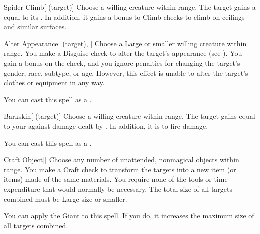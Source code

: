 \lowercase{\hypertarget{spell:Spider Climb}{}}\label{spell:Spider Climb}
\begin{attuneability}[\nth{1}]{\hypertarget{spell:Spider Climb}{Spider Climb}}[ (target)]
Choose a willing creature within \rngclose range.
The target gains a  equal to its .
In addition, it gains a  bonus to Climb checks to climb on ceilings and similar surfaces.
\end{attuneability}
\vspace{0.25em}



\lowercase{\hypertarget{spell:Alter Appearance}{}}\label{spell:Alter Appearance}
\begin{attuneability}[\nth{2}]{\hypertarget{spell:Alter Appearance}{Alter Appearance}}[ (target), ]
Choose a Large or smaller willing creature within \rngclose range.
You make a Disguise check to alter the target's appearance (see ).
You gain a  bonus on the check, and you ignore penalties for changing the target's gender, race, subtype, or age.
However, this effect is unable to alter the target's clothes or equipment in any way.

You can cast this spell as a .
\end{attuneability}
\vspace{0.25em}



\lowercase{\hypertarget{spell:Barkskin}{}}\label{spell:Barkskin}
\begin{attuneability}[\nth{2}]{\hypertarget{spell:Barkskin}{Barkskin}}[ (target)]
Choose a willing creature within \rngclose range.
The target gains  equal to your  against damage dealt by .
In addition, it is  to fire damage.

You can cast this spell as a .
\end{attuneability}
\vspace{0.25em}



\lowercase{\hypertarget{spell:Craft Object}{}}\label{spell:Craft Object}
\begin{apability}[\nth{3}]{\hypertarget{spell:Craft Object}{Craft Object}}[]
Choose any number of unattended, nonmagical objects within \rngclose range.
You make a Craft check to transform the targets into a new item (or items) made of the same materials.
You require none of the tools or time expenditure that would normally be necessary.
The total size of all targets combined must be Large size or smaller.

You can apply the Giant  to this spell.
If you do, it increases the maximum size of all targets combined.
\end{apability}
\vspace{0.25em}



